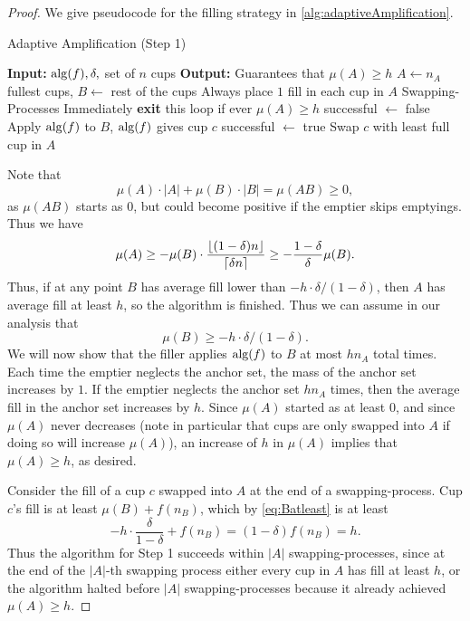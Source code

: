 \begin{proof}
  We give pseudocode for the filling strategy in
  \cref{alg:adaptiveAmplification}.

\begin{algorithm}
  \caption{Adaptive Amplification (Step 1)}
  \label{alg:adaptiveAmplification}
  \begin{algorithmic}
    \State \textbf{Input:} $\operatorname{\text{\textup{alg}}}(f), \delta, $ set of $n$ cups
    \State \textbf{Output:} Guarantees that $\mu(A) \ge h$
    \State
    \State $A \gets n_A$ fullest cups, $B \gets $ rest of the cups
    \State Always place $1$ fill in each cup in $A$
     \Comment Swapping-Processes
    \State Immediately \textbf{exit} this loop if ever $\mu(A) \ge h$ 
      \State successful $\gets $ false
      \State Apply $\operatorname{\text{\textup{alg}}}(f)$ to $B$, $\operatorname{\text{\textup{alg}}}(f)$ gives cup $c$
          \State successful $\gets$ true
        \EndIf
      \EndWhile
      \State Swap $c$ with least full cup in $A$
    \EndWhile
  \end{algorithmic}
\end{algorithm}
  
  Note that $$\mu(A) \cdot |A| + \mu(B)\cdot |B| = \mu(AB) \ge 0,$$
  as $\mu(AB)$ starts as $0$, but could become positive if the
  emptier skips emptyings.
  Thus we have 
  $$\mu(A) \ge - \mu(B) \cdot
  \frac{\left\lfloor (1-\delta)n \right\rfloor}{\left\lceil \delta n \right\rceil} \ge -
  \frac{1-\delta}{\delta} \mu(B).$$ Thus, if at any
  point $B$ has average fill lower than $-h \cdot
  \delta/(1-\delta)$, then $A$ has average fill at least $h$, so
  the algorithm is finished. Thus we can assume in our analysis that
  \begin{equation}
    \mu(B) \ge -h\cdot\delta/(1-\delta).
  \label{eq:Batleast}
  \end{equation}
  We will now show that the filler
  applies $\operatorname{\text{\textup{alg}}}(f)$ to $B$ at most $h n_A$ total times. 
  Each time the emptier neglects the anchor set, the mass of the
  anchor set increases by $1$. If the emptier neglects the anchor set $h
  n_A$ times, then the average fill in the anchor set increases by
  $h$. Since $\mu(A)$ started as at least $0$, and
  since $\mu(A)$ never decreases (note in particular that cups are only
  swapped into $A$ if doing so will increase $\mu(A)$), an
  increase of $h$ in $\mu(A)$ implies that $\mu(A) \ge h$, as
  desired.  

  Consider the fill of a cup $c$ swapped into $A$ at the end of a
  swapping-process. Cup $c$'s fill is at least $\mu(B) + f(n_B)$,
  which by \eqref{eq:Batleast} is at least
  $$-h \cdot \frac{\delta}{1-\delta} + f(n_B) = (1-\delta)f(n_B) = h.$$ 
  Thus the algorithm for Step 1 succeeds within $|A|$
  swapping-processes, since at the end of the $|A|$-th swapping
  process either every cup in $A$ has fill at least $h$, or the
  algorithm halted before $|A|$ swapping-processes because it
  already achieved $\mu(A) \ge h$. 
  

\end{proof}

